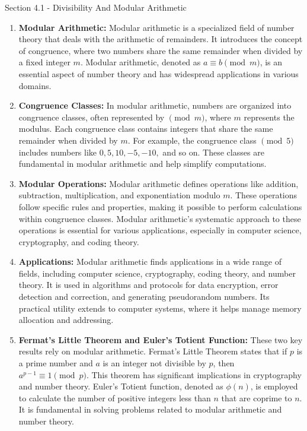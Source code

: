 \begin{notes}{Section 4.1 - Divisibility And Modular Arithmetic}
\begin{enumerate}
        \item \textbf{Modular Arithmetic:} Modular arithmetic is a specialized field of number theory that deals with the arithmetic of remainders. It introduces the concept of congruence, where two 
        numbers share the same remainder when divided by a fixed integer $m$. Modular arithmetic, denoted as $a \equiv b \pmod{m}$, is an essential aspect of number theory and has widespread applications 
        in various domains.
    
        \item \textbf{Congruence Classes:} In modular arithmetic, numbers are organized into congruence classes, often represented by $\pmod{m}$, where $m$ represents the modulus. Each congruence 
        class contains integers that share the same remainder when divided by $m$. For example, the congruence class $\pmod{5}$ includes numbers like $0, 5, 10, -5, -10,$ and so on. These classes are 
        fundamental in modular arithmetic and help simplify computations.
    
        \item \textbf{Modular Operations:} Modular arithmetic defines operations like addition, subtraction, multiplication, and exponentiation modulo $m$. These operations follow specific rules and 
        properties, making it possible to perform calculations within congruence classes. Modular arithmetic's systematic approach to these operations is essential for various applications, especially 
        in computer science, cryptography, and coding theory.
    
        \item \textbf{Applications:} Modular arithmetic finds applications in a wide range of fields, including computer science, cryptography, coding theory, and number theory. It is used in algorithms 
        and protocols for data encryption, error detection and correction, and generating pseudorandom numbers. Its practical utility extends to computer systems, where it helps manage memory allocation 
        and addressing.
    
        \item \textbf{Fermat's Little Theorem and Euler's Totient Function:} These two key results rely on modular arithmetic. Fermat's Little Theorem states that if $p$ is a prime number and $a$ is an 
        integer not divisible by $p$, then $a^{p-1} \equiv 1 \pmod{p}$. This theorem has significant implications in cryptography and number theory. Euler's Totient function, denoted as $\phi(n)$, is 
        employed to calculate the number of positive integers less than $n$ that are coprime to $n$. It is fundamental in solving problems related to modular arithmetic and number theory.
    \end{enumerate}


\end{notes}
